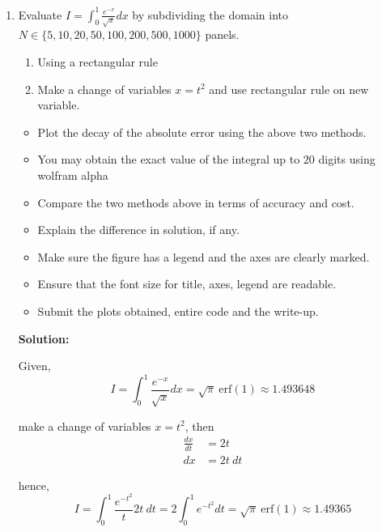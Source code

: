 \documentclass[a4paper,11pt]{report}
\begin{document}
\begin{enumerate}
    \vspace{1cm}

    \item Evaluate $I = \displaystyle \int_{0}^{1} \frac{e^{-x}}{\sqrt{x}} dx$ by
    subdividing the domain into $N \in \{5, 10, 20, 50, 100, 200, 500, 1000\}$ panels.

    \begin{enumerate}
    \item Using a rectangular rule
    \item Make a change of variables $x = t^{2}$ and use rectangular rule on new variable.
    \end{enumerate}

    \begin{itemize}
    \item Plot the decay of the absolute error using the above two methods.
    \item You may obtain the exact value of the integral up to $20$ digits using wolfram alpha
    \item Compare the two methods above in terms of accuracy and cost.
    \item Explain the difference in solution, if any.
    \item Make sure the figure has a legend and the axes are clearly marked.
    \item Ensure that the font size for title, axes, legend are readable.
    \item Submit the plots obtained, entire code and the write-up.
    \end{itemize}
    
    \textbf{Solution:}
    
    Given,
    \begin{equation*}
    I = \int_{0}^{1} \frac{e^{-x}}{\sqrt{x}} dx = \sqrt{\pi}\ \text{erf}(1) \approx 1.493648
    \end{equation*}

    make a change of variables $x = t^{2}$, then 
    \begin{equation*}
    \begin{aligned}
    \frac{dx}{dt} &= 2t \\
    dx &= 2t\ dt
    \end{aligned}
    \end{equation*}
    
    hence, 
    \begin{equation*}
    I = \int_{0}^{1} \frac{e^{-t^{2}}}{t} 2t\ dt = 2 \int_{0}^{1} e^{-t^{2}} dt = \sqrt{\pi}\ \text{erf}(1) \approx 1.49365
    \end{equation*}


\end{enumerate}
\end{document}
